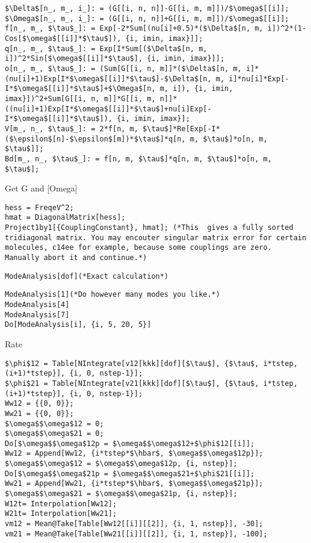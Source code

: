 \begin{itemize}[leftmargin = *]
\begin{lstlisting}
$\Delta$[n_, m_, i_]: = (G[[i, n, n]]-G[[i, m, m]])/$\omega$[[i]];
$\Omega$[n_, m_, i_]: = (G[[i, n, n]]+G[[i, m, m]])/$\omega$[[i]];
f[n_, m_, $\tau$_]: = Exp[-2*Sum[(nu[i]+0.5)*($\Delta$[n, m, i])^2*(1-Cos[$\omega$[[i]]*$\tau$]), {i, imin, imax}]];
q[n_, m_, $\tau$_]: = Exp[I*Sum[($\Delta$[n, m, i])^2*Sin[$\omega$[[i]]*$\tau$], {i, imin, imax}]];
o[n_, m_, $\tau$_]: = (Sum[G[[i, n, m]]*($\Delta$[n, m, i]*(nu[i]+1)Exp[I*$\omega$[[i]]*$\tau$]-$\Delta$[n, m, i]*nu[i]*Exp[-I*$\omega$[[i]]*$\tau$]+$\Omega$[n, m, i]), {i, imin, imax}])^2+Sum[G[[i, n, m]]*G[[i, m, n]]*((nu[i]+1)Exp[I*$\omega$[[i]]*$\tau$]+nu[i]Exp[-I*$\omega$[[i]]*$\tau$]), {i, imin, imax}];
V[m_, n_, $\tau$_]: = 2*f[n, m, $\tau$]*Re[Exp[-I*($\epsilon$[n]-$\epsilon$[m])*$\tau$]*q[n, m, $\tau$]*o[n, m, $\tau$]];
Bd[m_, n_, $\tau$_]: = f[n, m, $\tau$]*q[n, m, $\tau$]*o[n, m, $\tau$];
\end{lstlisting}
\large{Get G and [Omega]}
\begin{lstlisting}
hess = FreqeV^2;
hmat = DiagonalMatrix[hess];
Project1by1[{CouplingConstant}, hmat]; (*This  gives a fully sorted tridiagonal matrix. You may encouter singular matrix error for certain molecules, c14ee for example, because some couplings are zero. Manually abort it and continue.*)
\end{lstlisting}
\begin{lstlisting}
ModeAnalysis[dof](*Exact calculation*)
\end{lstlisting}
\begin{lstlisting}
ModeAnalysis[1](*Do however many modes you like.*)
ModeAnalysis[4]
ModeAnalysis[7]
Do[ModeAnalysis[i], {i, 5, 20, 5}]
\end{lstlisting}
\large{Rate}
\begin{lstlisting}
$\phi$12 = Table[NIntegrate[v12[kkk][dof][$\tau$], {$\tau$, i*tstep, (i+1)*tstep}], {i, 0, nstep-1}];
$\phi$21 = Table[NIntegrate[v21[kkk][dof][$\tau$], {$\tau$, i*tstep, (i+1)*tstep}], {i, 0, nstep-1}];
Ww12 = {{0, 0}};
Ww21 = {{0, 0}};
$\omega$$\omega$12 = 0;
$\omega$$\omega$21 = 0;
Do[$\omega$$\omega$12p = $\omega$$\omega$12+$\phi$12[[i]];
Ww12 = Append[Ww12, {i*tstep*$\hbar$, $\omega$$\omega$12p}];
$\omega$$\omega$12 = $\omega$$\omega$12p, {i, nstep}];
Do[$\omega$$\omega$21p = $\omega$$\omega$21+$\phi$21[[i]];
Ww21 = Append[Ww21, {i*tstep*$\hbar$, $\omega$$\omega$21p}];
$\omega$$\omega$21 = $\omega$$\omega$21p, {i, nstep}];
W12t= Interpolation[Ww12];
W21t= Interpolation[Ww21];
vm12 = Mean@Take[Table[Ww12[[i]][[2]], {i, 1, nstep}], -30];
vm21 = Mean@Take[Table[Ww21[[i]][[2]], {i, 1, nstep}], -100];

\end{lstlisting}
\end{itemize}
